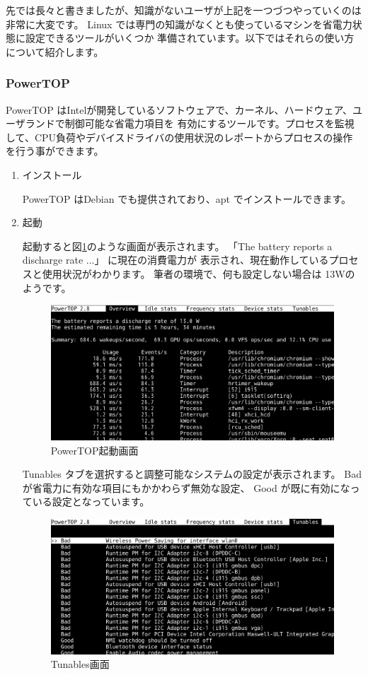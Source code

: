 \documentclass[mingoth,a4paper]{jsarticle}
\begin{document}
先では長々と書きましたが、知識がないユーザが上記を一つづつやっていくのは非常に大変です。
Linux では専門の知識がなくとも使っているマシンを省電力状態に設定できるツールがいくつか
準備されています。以下ではそれらの使い方について紹介します。

\subsubsection{PowerTOP}

PowerTOP はIntelが開発しているソフトウェアで、カーネル、ハードウェア、ユーザランドで制御可能な省電力項目を
有効にするツールです。プロセスを監視して、CPU負荷やデバイスドライバの使用状況のレポートからプロセスの操作
を行う事ができます。

\begin{enumerate}

\item インストール

PowerTOP はDebian でも提供されており、apt でインストールできます。
\begin{commandline}
\end{commandline}

\item 起動

起動すると図\ref{fig:powertop0}のような画面が表示されます。
「The battery reports a discharge rate ...」 に現在の消費電力が
表示され、現在動作しているプロセスと使用状況がわかります。
筆者の環境で、何も設定しない場合は 13Wのようです。

\begin{figure}[H]
\begin{center}
\includegraphics[width=0.5\hsize]{image201602/powertop_00.png}
\end{center}
\label{fig:powertop0}
\caption{PowerTOP起動画面} 
\end{figure}

Tunables タブを選択すると調整可能なシステムの設定が表示されます。
Badが省電力に有効な項目にもかかわらず無効な設定、
Good が既に有効になっている設定となっています。

\begin{figure}[H]
\begin{center}
\includegraphics[width=0.5\hsize]{image201602/powertop_01.png}
\end{center}
\label{fig:powertop1}
\caption{Tunables画面} 
\end{figure}


\end{enumerate}
\end{document}
